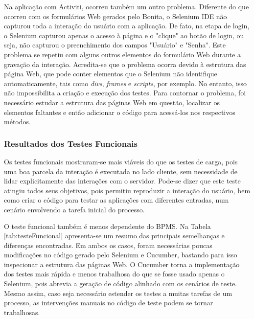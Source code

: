 \documentclass[12pt]{article}
\begin{document}

Na aplicação com Activiti, ocorreu também um outro problema. Diferente do que ocorreu com os formulários Web gerados pelo Bonita, o Selenium IDE não capturou toda a interação do usuário com a aplicação. De fato, na etapa de login, o Selenium capturou apenas o acesso à página e o "clique" ao botão de login, ou seja, não capturou o preenchimento dos campos "Usuário" e "Senha". Este problema se repetiu com alguns outros elementos do formulário Web durante a gravação da interação. Acredita-se que o problema ocorra devido à estrutura das página Web, que pode conter elementos que o Selenium não identifique automaticamente, tais como \emph{divs}, \emph{frames} e \emph{scripts}, por exemplo. No entanto, isso não impossibilita a criação e execução dos testes. Para contornar o problema, foi necessário estudar a estrutura das páginas Web em questão, localizar os elementos faltantes e então adicionar o código para acessá-los nos respectivos métodos.


\subsubsection{Resultados dos Testes Funcionais}

Os testes funcionais mostraram-se mais viáveis do que os testes de carga, pois uma boa parcela da interação é executada no lado cliente, sem necessidade de lidar explicitamente das interações com o servidor. Pode-se dizer que este teste atingiu todos seus objetivos, pois permitiu reproduzir a interação do usuário, bem como criar o código para testar as aplicações com diferentes entradas, num cenário envolvendo a tarefa inicial do processo.

O teste funcional também é menos dependente do BPMS. Na Tabela \ref{tab:testeFuncional} apresenta-se um resumo das principais semelhanças e diferenças encontradas. Em ambos os casos, foram necessárias poucas modificações no código gerado pelo Selenium e Cucumber, bastando para isso inspecionar a estrutura das páginas Web. O Cucumber torna a implementação dos testes mais rápida e menos trabalhosa do que se fosse usado apenas o Selenium, pois abrevia a geração de código alinhado com os cenários de teste. Mesmo assim, caso seja necessário estender os testes a muitas tarefas de um processo, as intervenções manuais no código de teste podem se tornar trabalhosas.
\end{document}
